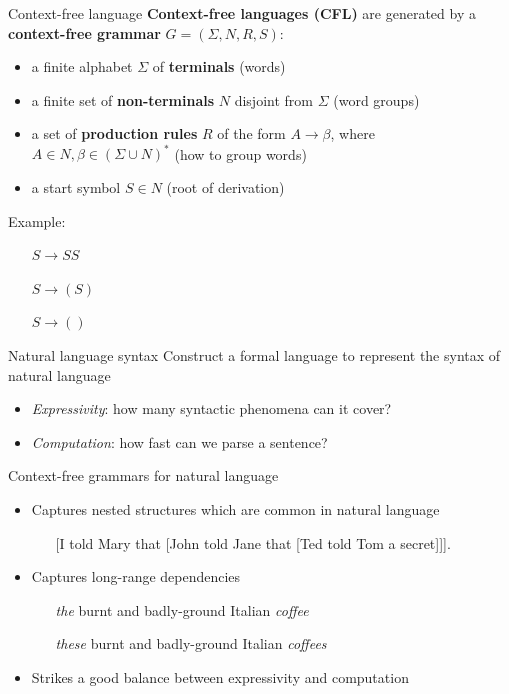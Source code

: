 \documentclass[usenames,dvipsnames,notes]{beamer}
\begin{document}
\begin{frame}
    {Context-free language}
    \textbf{Context-free languages (CFL)} are generated by a \textbf{context-free grammar} $G=(\Sigma, N, R, S)$:\\
    \begin{itemize}
        \item a finite alphabet $\Sigma$ of \textbf{terminals} (words)
        \item a finite set of \textbf{non-terminals} $N$ disjoint from $\Sigma$ (word groups)
        \item a set of \textbf{production rules} $R$ of the form $A\rightarrow\beta$,
            where $A \in N, \beta \in (\Sigma \cup N)^*$ (how to group words)
        \item a start symbol $S\in N$ (root of derivation)
    \end{itemize}

    Example:\\
    \begin{itemize}
        \item[] $S\rightarrow SS$
        \item[] $S\rightarrow (S)$
        \item[] $S\rightarrow ()$
    \end{itemize}
\end{frame}

\begin{frame}
    {Natural language syntax}
    Construct a formal language to represent the syntax of natural language\\
    \begin{itemize}
        \item \emph{Expressivity}: how many syntactic phenomena can it cover?
        \item \emph{Computation}: how fast can we parse a sentence?
    \end{itemize}

    Context-free grammars for natural language\\
    \begin{itemize}
        \item Captures nested structures which are common in natural language 
            \begin{itemize}
                \item[] [I told Mary that [John told Jane that [Ted told Tom a secret]]].
            \end{itemize}
        \item Captures long-range dependencies
            \begin{itemize}
                \item[] \emph{the} burnt and badly-ground Italian \emph{coffee}
                \item[] \emph{these} burnt and badly-ground Italian \emph{coffees}
            \end{itemize}
        \item Strikes a good balance between expressivity and computation
    \end{itemize}
\end{frame}
\end{document}
